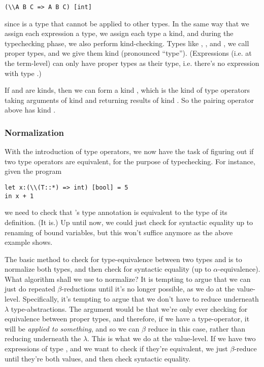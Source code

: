 \documentclass[pageno]{jpaper}
\begin{document}
{{{\begin{lstlisting}
(\\A B C => A B C) [int]
\end{lstlisting}
since  is a type that cannot be applied to other types.
In the same way that we assign each expression a type, we assign each type a kind, and during the
typechecking phase, we also perform kind-checking. Types like , , and
, we call proper types, and we give them kind \lsti{*} (pronounced ``type'').
(Expressions (i.e. at the term-level) can only have proper types as their type, i.e. there's no
expression with type .)

If  and   are kinds, then we can form a kind , which is the kind of
type operators taking arguments of kind  and returning results of kind . So the pairing operator above has kind \lsti{* -> *}.

\subsubsection{Normalization}

With the introduction of type operators, we now have the task of figuring out if two type operators are
equivalent, for the purpose of typechecking. For instance, given the program
\begin{lstlisting}
let x:(\\(T::*) => int) [bool] = 5
in x + 1
\end{lstlisting}
we need to check that 's type annotation is equivalent to the type of its definition. (It is.)
Up until now, we could just check for syntactic equality up to renaming of bound variables, but this won't
suffice anymore as the above example shows.

The basic method to check for type-equivalence between two types  and  is to normalize
both types, and then check for syntactic equality (up to $\alpha$-equivalence).
What algorithm shall we use to normalize? 
It is tempting to argue that we can just do repeated $\beta$-reductions until
it's no longer possible, as we do at the value-level. Specifically, it's tempting to argue that we don't
have to reduce underneath $\lambda$ type-abstractions. The argument would be that we're only ever checking
for equivalence between proper types, and therefore, if we have a type-operator, it will be \textit{applied to something}, and so we can $\beta$ reduce in this case, rather than reducing underneath the $\lambda$.
This is what we do at the value-level. If we have two expressions of type , and we want to check
if they're equivalent, we just $\beta$-reduce until they're both values, and then check syntactic equality.

}}}
\end{document}
